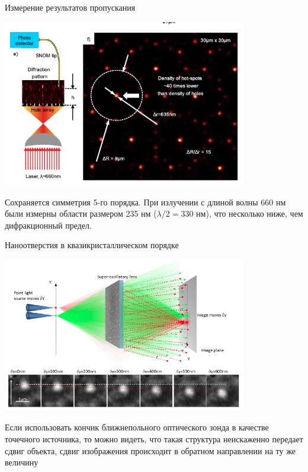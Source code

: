 \documentclass[9pt, compress, xcolor=table]{beamer}
\begin{document}
\begin{frame}{Измерение результатов пропускания}
\begin{center}
\includegraphics[width=0.8\textwidth]{nh11}

Сохраняется симметрия 5-го порядка. При излучении с длиной волны 660 нм были измерны области размером 235 нм ($\lambda/2 = 330$ нм), что несколько ниже, чем дифракционный предел.
\end{center}

\end{frame}

\begin{frame}{Наноотверстия в квазикристаллическом порядке}
\begin{center}
\includegraphics[width=0.8\textwidth]{nh12}
\end{center}
Если использовать кончик  ближнепольного оптического зонда в качестве точечного источника, то можно видеть, что такая структура неискаженно передает сдвиг объекта, сдвиг изображения происходит в обратном направлении на ту же величину
\end{frame}
\end{document}
